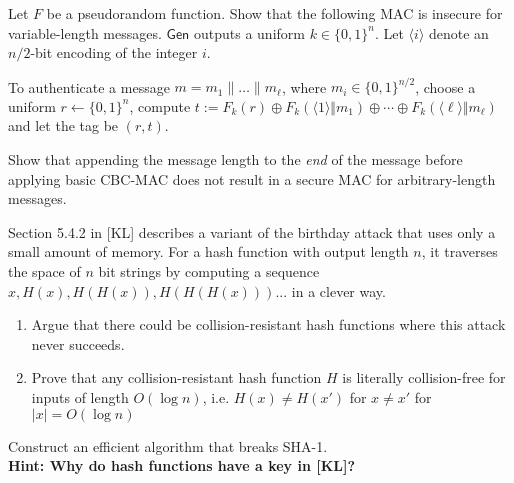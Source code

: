 \documentclass[a4paper,10pt,landscape,twocolumn]{scrartcl}
\begin{document}
\pagebreak

\begin{bonusexercise}

Let $F$ be a pseudorandom function. Show that the following MAC is insecure for variable-length messages. $\mathsf{Gen}$ outputs a uniform $k\in\{0,1\}^n$. Let $\langle i\rangle$ denote an $n/2$-bit encoding of the integer $i$.

To authenticate a message $m=m_1\|\dots\| m_{\ell}$, where $m_i\in\{0,1\}^{n/2}$, choose a uniform $r\gets\{0,1\}^n$, compute $t:=F_k(r)\oplus F_k(\langle 1\rangle\Vert m_1)\oplus\cdots\oplus F_k(\langle \ell\rangle\Vert m_{\ell})$ and let the tag be $( r,t)$.

\end{bonusexercise}

\begin{bonusexercise}
Show that appending the message length to the \emph{end} of the message before applying basic CBC-MAC does not result in a secure MAC for arbitrary-length messages.
\end{bonusexercise}

\begin{bonusexercise}
Section 5.4.2 in [KL] describes a variant of the birthday attack that uses only a small amount of memory. For a hash function with output length $n$, it traverses the space of $n$ bit strings by computing a sequence $x, H(x), H(H(x)), H(H(H(x)))...$ in a clever way.
\begin{enumerate}
	\item Argue that there could be collision-resistant hash functions where this attack never succeeds.
	\item Prove that any collision-resistant hash function $H$ is literally collision-free for inputs of length $O(\log n)$, i.e. $H(x)\neq H(x')$ for $x\neq x'$ for $|x|=O(\log n)$
\end{enumerate}
\end{bonusexercise}

\begin{bonusexercise}[SHA-1]
	Construct an efficient algorithm that breaks SHA-1.\\
	\textbf{Hint: Why do hash functions have a key in [KL]?}
\end{bonusexercise}
\end{document}
